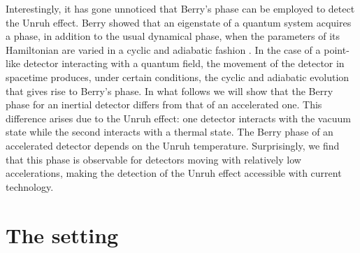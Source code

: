 Interestingly, it has gone unnoticed that Berry's phase can be employed to detect the Unruh effect. Berry showed that an eigenstate of a quantum system acquires a phase, in addition to the usual dynamical phase, when the parameters of its Hamiltonian are varied in a cyclic and adiabatic fashion \cite{Berryoriginal}.  In the case of a point-like detector interacting with a quantum field, the movement of the detector in spacetime produces, under certain conditions, the cyclic and adiabatic evolution that gives rise to Berry's phase. In what follows we will show that the Berry phase for an inertial detector
differs from that of an accelerated one.  This difference arises due to the Unruh effect: one detector interacts with the vacuum state while the second interacts with a thermal state. The Berry phase of an accelerated detector depends on the Unruh temperature. Surprisingly, we find that this phase is observable for detectors moving with relatively low accelerations, making the detection of the Unruh effect  accessible with current technology.

\section{The setting}


